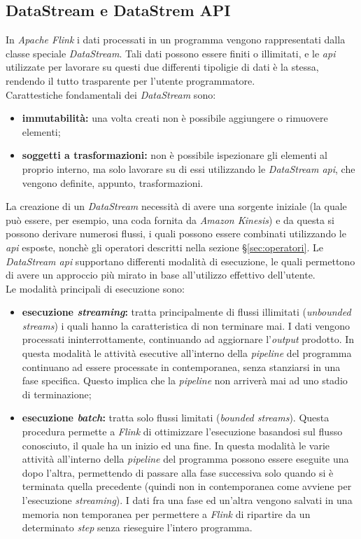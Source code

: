 \subsection{DataStream e DataStrem API}
In \textit{Apache Flink} i dati processati in un programma vengono rappresentati dalla classe speciale \textit{DataStream}.
Tali dati possono essere finiti o illimitati, e le \textit{\gls{api}} utilizzate per lavorare su questi due differenti tipoligie di dati è la stessa, rendendo il tutto trasparente per l'utente programmatore.\\
Carattestiche fondamentali dei \textit{DataStream} sono:
\begin{itemize}
	\item{\textbf{immutabilità:} una volta creati non è possibile aggiungere o rimuovere elementi;}
	\item{\textbf{soggetti a trasformazioni:} non è possibile ispezionare gli elementi al proprio interno, ma solo lavorare su di essi utilizzando le \textit{DataStream \textit{\gls{api}}}, che vengono definite, appunto, trasformazioni.}
\end{itemize}
La creazione di un \textit{DataStream} necessità di avere una sorgente iniziale (la quale può essere, per esempio, una coda fornita da \textit{\gls{Amazon Kinesis}}) e da questa si possono derivare numerosi flussi, i quali possono essere combinati utilizzando le \textit{\gls{api}} esposte, nonchè gli operatori descritti nella sezione \S\ref{sec:operatori}.
Le \textit{DataStream \textit{\gls{api}}} supportano differenti modalità di esecuzione, le quali permettono di avere un approccio più mirato in base all'utilizzo effettivo dell'utente.\\
Le modalità principali di esecuzione sono:
\begin{itemize}
	\item{\textbf{esecuzione \textit{streaming}:} tratta principalmente di flussi illimitati (\textit{\gls{unbounded streams}}) i quali hanno la caratteristica di non terminare mai. I dati vengono processati ininterrottamente, continuando ad aggiornare l'\textit{output} prodotto. In questa modalità le attività esecutive all'interno della \textit{\gls{pipeline}} del programma continuano ad essere processate in contemporanea, senza stanziarsi in una fase specifica. Questo implica che la \textit{\gls{pipeline}} non arriverà mai ad uno stadio di terminazione;}
	\item{\textbf{esecuzione \textit{batch}:} tratta solo flussi limitati (\textit{\gls{bounded streams}}). Questa procedura permette a \textit{Flink} di ottimizzare l'esecuzione basandosi sul flusso conosciuto, il quale ha un inizio ed una fine. In questa modalità le varie attività all'interno della \textit{\gls{pipeline}} del programma possono essere eseguite una dopo l'altra, permettendo di passare alla fase successiva solo quando si è terminata quella precedente (quindi non in contemporanea come avviene per l'esecuzione \textit{streaming}). I dati fra una fase ed un'altra vengono salvati in una memoria non temporanea per permettere a \textit{Flink} di ripartire da un determinato \textit{step} senza rieseguire l'intero programma.}
\end{itemize}

